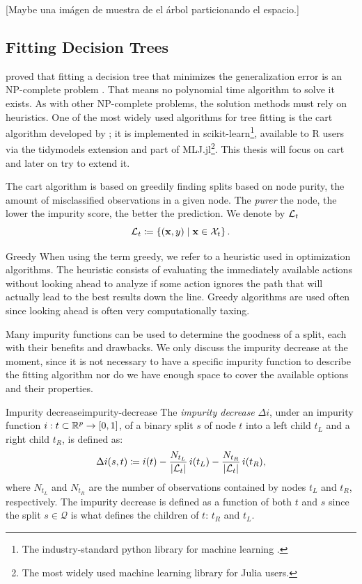 [Maybe una imágen de muestra de el árbol particionando el espacio.]

\subsection{Fitting Decision Trees}

\citeauthor{hyafil1976} proved that fitting a decision tree that minimizes the
generalization error is an NP-complete problem \cite{hyafil1976}. That means no
polynomial time algorithm to solve it exists. As with other NP-complete
problems, the solution methods must rely on heuristics. One of the most widely
used algorithms for tree fitting is the \acl{cart} algorithm developed by
\citeauthor{breiman2017} \cite{breiman2017}; it is implemented in
scikit-learn\footnote{The industry-standard python library for machine learning
\cite{louppe2014}.}, available to R users via the tidymodels extension and part
of MLJ.jl\footnote{The most widely used machine learning library for Julia
users.}. This thesis will focus on \ac{cart} and later on try to extend it.

The \ac{cart} algorithm is based on greedily finding splits based on node
purity, the amount of misclassified observations in a given node. The
\textit{purer} the node, the lower the impurity score, the better the
prediction. We denote by $\mathcal{L}_t$
\[
    \mathcal{L}_t \coloneqq \left\{ (\mathbf{x}, y) \mid \mathbf{x} \in \mathcal{X}_t \right\}.
\]

\begin{remark}{Greedy}
    When using the term greedy, we refer to a heuristic used in optimization
    algorithms. The heuristic consists of evaluating the immediately available
    actions without looking ahead to analyze if some action ignores the path
    that will actually lead to the best results down the line. Greedy algorithms
    are used often since looking ahead is often very computationally taxing.
\end{remark}

Many impurity functions can be used to determine the goodness of a split, each
with their benefits and drawbacks. We only discuss the impurity decrease at the
moment, since it is not necessary to have a specific impurity function to
describe the fitting algorithm nor do we have enough space to cover the
available options and their properties.

\begin{dfn}{Impurity decrease}{impurity-decrease}
    The \emph{impurity decrease} $\Delta i$, under an impurity function $i: t
    \subset \mathbb{R}^{p} \to [0, 1]$, of a binary split $s$ of node $t$ into a left
    child $t_L$ and a right child $t_R$, is defined as: 
    \[
        \Delta i(s, t) \coloneqq i(t) - \frac{N_{t_L}}{|\mathcal{L}_t|} \, i(t_L) - \frac{N_{t_R}}{|\mathcal{L}_t|} \, i(t_R),
    \]
    where $N_{t_L}$ and $N_{t_R}$ are the number of observations contained by
    nodes $t_L$ and $t_R$, respectively. The impurity decrease is defined as a
    function of both $t$ and $s$ since the split $s \in \mathcal{Q}$ is what
    defines the children of $t$: $t_R$ and $t_L$.
\end{dfn}

